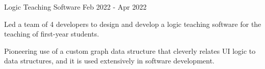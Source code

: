 \begin{cventries}
  \cventry
    {}
    {Logic Teaching Software} %
    {} %
    {Feb 2022 - Apr 2022} %
    {
      \begin{cvitems} %
        \item {Led a team of 4 developers to design and develop a logic teaching software for the teaching of first-year students.}
        \item {Pioneering use of a custom graph data structure that cleverly relates UI logic to data structures, and it is used extensively in software development.}
      \end{cvitems}
    }
  
\end{cventries}
